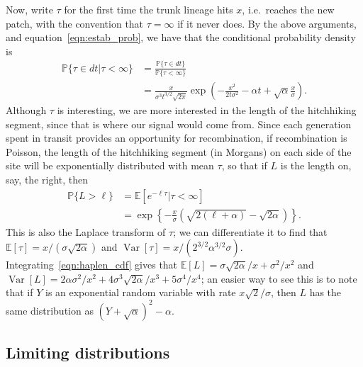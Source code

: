 \documentclass{article}
\DeclareMathOperator{\var}{Var}
\renewcommand{\P}{\mathbb{P}}
\newcommand{\E}{\mathbb{E}}
\begin{document}
Now, write $\tau$ for the first time the trunk lineage hits $x$, i.e.\ reaches the new patch,
with the convention that $\tau=\infty$ if it never does.
By the above arguments, and equation~\eqref{eqn:estab_prob}, we have that the conditional probability density is
\begin{align}
  \P\{\tau\in dt | \tau<\infty \} &= \frac{\P\{\tau \in dt\}}{\P\{\tau<\infty\}} \\
  &= \frac{x}{\sigma^3 t^{3/2}\sqrt{2\pi}} \exp\left(-\frac{x^2}{2t\sigma^2} -\alpha t + \sqrt{\alpha} \frac{x}{\sigma} \right) .
\end{align}
Although $\tau$ is interesting, we are more interested in the length of the hitchhiking segment,
since that is where our signal would come from.
Since each generation spent in transit provides an opportunity for recombination,
if recombination is Poisson, the length of the hitchhiking segment (in Morgans) on each side of the site will be exponentially distributed
with mean $\tau$, so that if $L$ is the length on, say, the right, then
\begin{align} \label{eqn:haplen_cdf}
\P\{L>\ell\} &= \E[e^{-\ell \tau}|\tau<\infty] \\
&= \exp\left\{{-\frac{x}{\sigma}\left(\sqrt{2(\ell+\alpha)} - \sqrt{2\alpha}\right)}\right\} .
\end{align}
This is also the Laplace transform of $\tau$;
we can differentiate it to find that $\E[\tau] = x/(\sigma\sqrt{2\alpha})$
and $\var[\tau] = x/( 2^{3/2}\alpha^{3/2}\sigma)$.
Integrating~\eqref{eqn:haplen_cdf} gives that 
$\E[L] = \sigma \sqrt{2\alpha}/x + \sigma^2/x^2$ and $\var[L] = 2\alpha\sigma^2/x^2 + 4 \sigma^3 \sqrt{2\alpha}/x^3 + 5 \sigma^4 / x^4$;
an easier way to see this is to note that if $Y$ is an exponential random variable with rate $x\sqrt{2}/\sigma$,
then $L$ has the same distribution as $(Y + \sqrt{\alpha})^2 - \alpha$.

\subsection{Limiting distributions}
\end{document}
